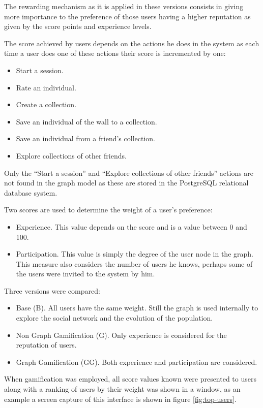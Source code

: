 \documentclass[conference]{IEEEtran}
\begin{document}
The rewarding mechanism as it is applied in these versions 
consists in giving more importance to the preference of those users having a higher reputation
as given by the score points and experience levels.  

The score achieved by users depends on the actions he does in the system as
each time a user does one of these actions their score is incremented by one:
\begin{itemize}
\item Start a session.
\item Rate an individual.
\item Create a collection.
\item Save an individual of the wall to a collection.
\item Save an individual from a friend's collection.
\item Explore collections of other friends.
\end{itemize}

Only the ``Start a session'' and ``Explore collections of other friends'' actions 
are not found in the graph model as these are stored in the PostgreSQL relational
database system. 

Two scores are used to determine the weight of a user's preference:
\begin{itemize}
\item Experience. This value depends on the score and is a value 
between 0 and 100. 

\item Participation. This value is simply the degree of the user node 
in the graph. This measure also considers the number of users he knows,
perhaps some of the users were invited to the system by him.   
\end{itemize}

Three versions were compared:
\begin{itemize}
\item Base (B). All users have the same weight. Still the graph is used internally to explore
the social network and the evolution of the population.
\item Non Graph Gamification (G). Only experience is considered for the reputation of users. 
\item Graph Gamification (GG). Both experience and participation are considered.
\end{itemize}
When gamification was employed, all score values known were presented to users
along with a ranking of users by their weight was shown in a window, as an example
a screen capture of this interface is shown in figure \ref{fig:top-users}. 
\end{document}
